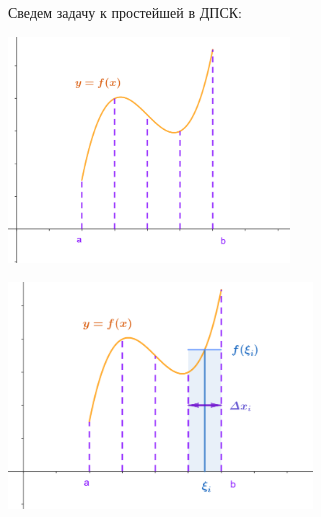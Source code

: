 \documentclass[12pt]{article}
\begin{document}
    Сведем задачу к простейшей в ДПСК:

    \vspace{10mm}


    \begin{multicols}{2}
        \includegraphics[height=6cm]{images/calculus_2024_02_07_2}

        \includegraphics[height=6cm]{images/calculus_2024_02_07_3}
    \end{multicols}
\end{document}
